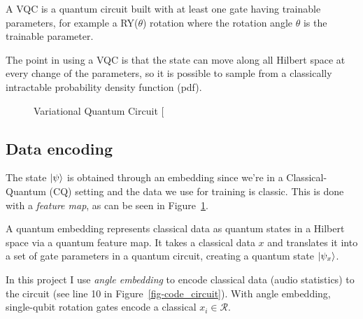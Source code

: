 \documentclass[
  13pt,
  a4paper,
  DIV=11,
  numbers=noendperiod]{scrreprt}
\begin{document}
A VQC is a quantum circuit built with at least one gate having trainable
parameters, for example a RY(\(\theta\)) rotation where the rotation
angle \(\theta\) is the trainable parameter.

The point in using a VQC is that the state can move along all Hilbert
space at every change of the parameters, so it is possible to sample
from a classically intractable probability density function (pdf).

\begin{figure}


\caption{\label{fig-vqc}Variational Quantum Circuit
{[}\citeproc{ref-vqc_tut}{2}{]}}

\end{figure}%

\subsection{Data encoding}\label{data-encoding}

The state \(\ket{\psi}\) is obtained through an embedding since we're in
a Classical-Quantum (CQ) setting and the data we use for training is
classic. This is done with a \emph{feature map}, as can be seen in
Figure~\ref{fig-vqc}.

A quantum embedding represents classical data as quantum states in a
Hilbert space via a quantum feature map. It takes a classical data \(x\)
and translates it into a set of gate parameters in a quantum circuit,
creating a quantum state \(\ket{\psi_x}\).

In this project I use \emph{angle embedding} to encode classical data
(audio statistics) to the circuit (see line 10 in
Figure~\ref{fig-code_circuit}). With angle embedding, single-qubit
rotation gates encode a classical \(x_i \in \mathcal{R}\).
\end{document}

